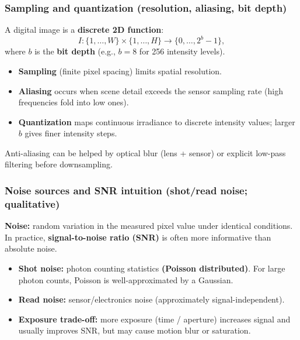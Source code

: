 \documentclass[11pt,a4paper]{article}
\begin{document}
\subsubsection{Sampling and quantization (resolution, aliasing, bit depth)}

\begin{defbox}
A digital image is a \textbf{discrete 2D function}:
\[
I:\{1,\dots,W\}\times\{1,\dots,H\}\to \{0,\dots,2^b-1\},
\]
where $b$ is the \textbf{bit depth} (e.g., $b=8$ for 256 intensity levels).
\end{defbox}

\begin{itemize}
  \item \textbf{Sampling} (finite pixel spacing) limits spatial resolution.
  \item \textbf{Aliasing} occurs when scene detail exceeds the sensor sampling rate (high frequencies fold into low ones).
  \item \textbf{Quantization} maps continuous irradiance to discrete intensity values; larger $b$ gives finer intensity steps.
\end{itemize}

\begin{notebox}
Anti-aliasing can be helped by optical blur (lens + sensor) or explicit low-pass filtering before downsampling.
\end{notebox}


\subsubsection{Noise sources and SNR intuition (shot/read noise; qualitative)}

\begin{defbox}
\textbf{Noise:} random variation in the measured pixel value under identical conditions.
In practice, \textbf{signal-to-noise ratio (SNR)} is often more informative than absolute noise.
\end{defbox}

\begin{itemize}
    \item \textbf{Shot noise:} photon counting statistics \textbf{(Poisson distributed)}. For large photon counts, Poisson is well-approximated by a Gaussian.
  \item \textbf{Read noise:} sensor/electronics noise (approximately signal-independent).
  \item \textbf{Exposure trade-off:} more exposure (time / aperture) increases signal and usually improves SNR, but may cause motion blur or saturation.
\end{itemize}
\end{document}
